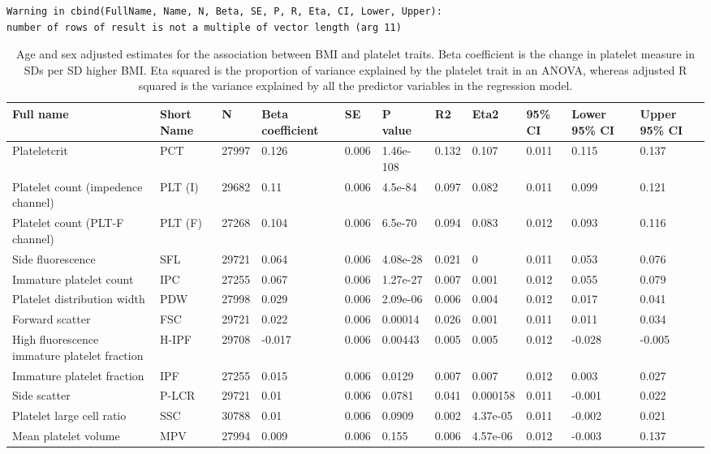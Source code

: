 \documentclass[11pt,twoside]{bristolthesis}
\begin{document}
\begin{verbatim}
Warning in cbind(FullName, Name, N, Beta, SE, P, R, Eta, CI, Lower, Upper):
number of rows of result is not a multiple of vector length (arg 11)
\end{verbatim}
\begin{landscape}\begin{table}

\caption[Age and sex adjusted estimates for the association between BMI and platelet traits]{\label{tab:BMI-platelets-unadjust}Age and sex adjusted estimates for the association between BMI and platelet traits. Βeta coefficient is the change in platelet measure in SDs per SD higher BMI. Eta squared is the proportion of variance explained by the platelet trait in an ANOVA, whereas adjusted R squared is the variance explained by all the predictor variables in the regression model.}
\centering
\begin{tabu} to 
\toprule
Full name & Short Name & N & Βeta coefficient & SE & P value & R2 & Eta2 & 95\% CI & Lower 95\% CI & Upper 95\% CI\\
\midrule
Plateletcrit & PCT & 27997 & 0.126 & 0.006 & 1.46e-108 & 0.132 & 0.107 & 0.011 & 0.115 & 0.137\\
Platelet count (impedence channel) & PLT (I) & 29682 & 0.11 & 0.006 & 4.5e-84 & 0.097 & 0.082 & 0.011 & 0.099 & 0.121\\
Platelet count (PLT-F channel) & PLT (F) & 27268 & 0.104 & 0.006 & 6.5e-70 & 0.094 & 0.083 & 0.012 & 0.093 & 0.116\\
Side fluorescence & SFL & 29721 & 0.064 & 0.006 & 4.08e-28 & 0.021 & 0 & 0.011 & 0.053 & 0.076\\
Immature platelet count & IPC & 27255 & 0.067 & 0.006 & 1.27e-27 & 0.007 & 0.001 & 0.012 & 0.055 & 0.079\\
\addlinespace
Platelet distribution width & PDW & 27998 & 0.029 & 0.006 & 2.09e-06 & 0.006 & 0.004 & 0.012 & 0.017 & 0.041\\
Forward scatter & FSC & 29721 & 0.022 & 0.006 & 0.00014 & 0.026 & 0.001 & 0.011 & 0.011 & 0.034\\
High fluorescence immature platelet fraction & H-IPF & 29708 & -0.017 & 0.006 & 0.00443 & 0.005 & 0.005 & 0.012 & -0.028 & -0.005\\
Immature platelet fraction & IPF & 27255 & 0.015 & 0.006 & 0.0129 & 0.007 & 0.007 & 0.012 & 0.003 & 0.027\\
Side scatter & P-LCR & 29721 & 0.01 & 0.006 & 0.0781 & 0.041 & 0.000158 & 0.011 & -0.001 & 0.022\\
\addlinespace
Platelet large cell ratio & SSC & 30788 & 0.01 & 0.006 & 0.0909 & 0.002 & 4.37e-05 & 0.011 & -0.002 & 0.021\\
Mean platelet volume & MPV & 27994 & 0.009 & 0.006 & 0.155 & 0.006 & 4.57e-06 & 0.012 & -0.003 & 0.137\\
\bottomrule
\end{tabu}
\end{table}
\end{landscape}
\end{document}
